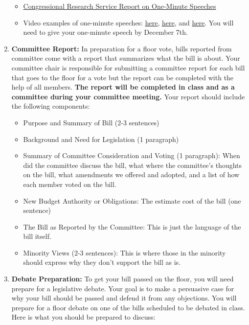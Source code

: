 \documentclass[11pt]{article}
\begin{document}
\begin{enumerate}
		\begin{itemize}
			\item \href{https://fas.org/sgp/crs/misc/RL30135.pdf}{Congressional Research Service Report on One-Minute Speeches}
			\item Video examples of one-minute speeches: \href{https://www.youtube.com/watch?v=VRXsfdsNjeE}{here}, \href{https://www.youtube.com/watch?v=N_d983XadFM}{here}, and \href{https://www.youtube.com/watch?v=Sni_9m5Nvlc}{here}.
			{\color{red} You will need to give your one-minute speech by December 7th.}
		\end{itemize} 
		\item \textbf{Committee Report:} In preparation for a floor vote, bills reported from committee come with a report that summarizes what the bill is about. Your committee chair is responsible for submitting a committee report for each bill that goes to the floor for a vote but the report can be completed with the help of all members. \textbf{The report will be completed in class and as a committee during your committee meeting.} Your report should include the following components:
			\begin{itemize}
				\item Purpose and Summary of Bill (2-3 sentences)
				\item Background and Need for Legislation (1 paragraph)
				\item Summary of Committee Consideration and Voting (1 paragraph): When did the committee discuss the bill, what where the committee's thoughts on the bill, what amendments we offered and adopted, and a list of how each member voted on the bill.
				\item New Budget Authority or Obligations: The estimate cost of the bill (one sentence)
				\item The Bill as Reported by the Committee: This is just the language of the bill itself.
				\item Minority Views (2-3 sentences): This is where those in the minority should express why they don't support the bill as is.
			\end{itemize}
			\item \textbf{Debate Preparation:} To get your bill passed on the floor, you will need prepare for a legislative debate. Your goal is to make a persuasive case for why your bill should be passed and defend it from any objections. You will prepare for a floor debate on one of the bills scheduled to be debated in class. Here is what you should be prepared to discuss:
				\begin{itemize}

\end{itemize}
\end{enumerate}
\end{document}
